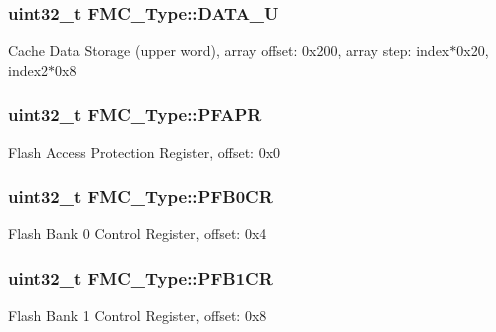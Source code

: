 \subsubsection[{\texorpdfstring{D\+A\+T\+A\+\_\+U}{DATA_U}}]{ uint32\+\_\+t F\+M\+C\+\_\+\+Type\+::\+D\+A\+T\+A\+\_\+U}\hypertarget{structFMC__Type_a6a67e81c770c1a5c2b6cbbd5239242c6}{}\label{structFMC__Type_a6a67e81c770c1a5c2b6cbbd5239242c6}
Cache Data Storage (upper word), array offset\+: 0x200, array step\+: index$\ast$0x20, index2$\ast$0x8 
\subsubsection[{\texorpdfstring{P\+F\+A\+PR}{PFAPR}}]{ uint32\+\_\+t F\+M\+C\+\_\+\+Type\+::\+P\+F\+A\+PR}\hypertarget{structFMC__Type_ab9738b2970c2c6c4a0c5948b181154f8}{}\label{structFMC__Type_ab9738b2970c2c6c4a0c5948b181154f8}
Flash Access Protection Register, offset\+: 0x0 
\subsubsection[{\texorpdfstring{P\+F\+B0\+CR}{PFB0CR}}]{ uint32\+\_\+t F\+M\+C\+\_\+\+Type\+::\+P\+F\+B0\+CR}\hypertarget{structFMC__Type_addc2732843e4b2b25a50de98f9db47ab}{}\label{structFMC__Type_addc2732843e4b2b25a50de98f9db47ab}
Flash Bank 0 Control Register, offset\+: 0x4 
\subsubsection[{\texorpdfstring{P\+F\+B1\+CR}{PFB1CR}}]{ uint32\+\_\+t F\+M\+C\+\_\+\+Type\+::\+P\+F\+B1\+CR}\hypertarget{structFMC__Type_afa824c39043a1b8cc1c25fe55f72a389}{}\label{structFMC__Type_afa824c39043a1b8cc1c25fe55f72a389}
Flash Bank 1 Control Register, offset\+: 0x8 
